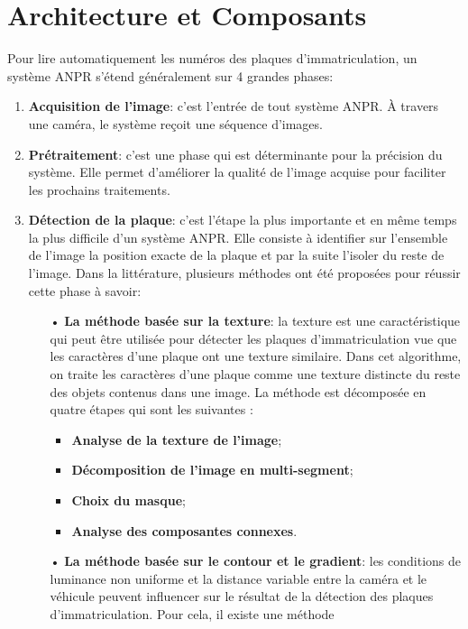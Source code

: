 \section{Architecture et Composants}
Pour lire automatiquement les numéros des plaques d’immatriculation, un système ANPR s’étend généralement sur 4 grandes phases:
\begin{enumerate}
    \item \textbf{Acquisition de l’image}: c’est l’entrée de tout système ANPR. À travers une caméra, le système reçoit une séquence d’images.
    \item \textbf{Prétraitement}: c’est une phase qui est déterminante pour la précision du système. Elle permet d’améliorer la qualité de l’image acquise pour faciliter les prochains traitements.
    \item \textbf{Détection de la plaque}: c’est l’étape la plus importante et en même temps la plus difficile d’un système ANPR. Elle consiste à identifier sur l’ensemble de l’image la position exacte de la plaque et par la suite l’isoler du reste de l’image. Dans la littérature, plusieurs méthodes ont été proposées pour réussir cette phase à savoir:
        \begin{itemize}
            \item[•] \textbf{La méthode basée sur la texture}: la texture est une caractéristique qui peut être utilisée pour détecter les plaques d’immatriculation vue
            que les caractères d’une plaque ont une texture similaire. Dans cet algorithme, on traite les caractères
            d’une plaque comme une texture distincte du reste des objets contenus dans une image. La méthode est
            décomposée en quatre étapes qui sont les suivantes :
                \begin{itemize}
                    \item \textbf{Analyse de la texture de l’image};
                    \item \textbf{Décomposition de l’image en multi-segment};
                    \item \textbf{Choix du masque};
                    \item \textbf{Analyse des composantes connexes}.
                \end{itemize}
            \item[•] \textbf{La méthode basée sur le contour et le gradient}: les conditions de luminance non uniforme et la distance variable entre la caméra et le véhicule peuvent
            influencer sur le résultat de la détection des plaques d’immatriculation. Pour cela, il existe une méthode

\end{itemize}
\end{enumerate}
